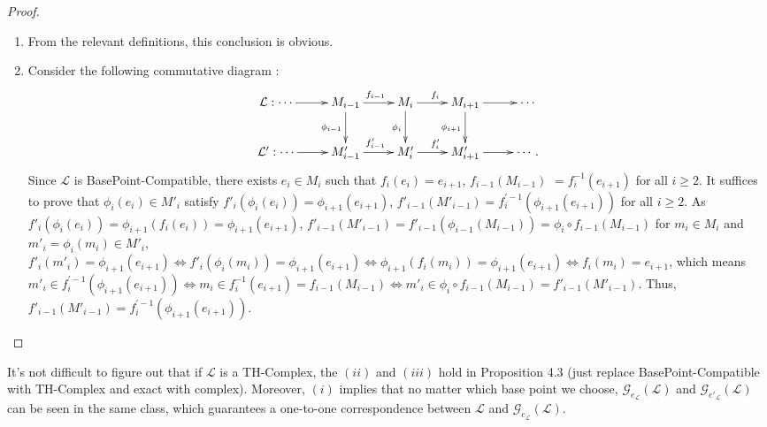 \documentclass[11pt, twoside]{article}
\begin{document}
\begin{proof}
\begin{enumerate}
  \begin{align*}
\tau^{e'_{i+1}}_{f_{i}(e'_{i})}f_i\tau^{e'_i}_{e_i}(m)&=\tau^{e'_{i+1}}_{f_{i}(e'_{i})}f_i([m,e_i,e'_i])\\
&=[[f_i(m),f_i(e_i),f_i(e'_i)],f_{i}(e'_{i}),e'_{i+1}]\\
&=[f_i(m),f_i(e_i),e'_{i+1}]
\end{align*}
and
  \begin{align*}
\tau^{e'_{i+1}}_{e_{i+1}}\tau^{e_{i+1}}_{f_{i}(e_{i})}f_i(m)&=\tau^{e'_{i+1}}_{e_{i+1}}([f_i(m),e_{i+1},f_{i}(e_{i})])\\
&=[[f_i(m),f_{i}(e_{i}),e_{i+1}],e_{i+1},e'_{i+1}]\\
&=[f_i(m),f_i(e_i),e'_{i+1}],
\end{align*}
$\tau^{e'_{i+1}}_{f_{i}(e'_{i})}f_i\tau^{e'_i}_{e_i}=\tau^{e'_{i+1}}_{e_{i+1}}\tau^{e_{i+1}}_{f_{i}(e_{i})}f_i,$ which means the diagram is commutative.
    \item[(ii)] From the relevant definitions, this conclusion is obvious.
    \item[(iii)] Consider the following commutative diagram :\\
    $$ \xymatrix{\mathcal{L}:\cdots \ar[r] & M_{i-1} \ar[d]_{\phi_{i-1}} \ar[r]^{f_{i-1}} & M_{i} \ar[d]_{\phi_i} \ar[r]^{f_{i}} & M_{i+1} \ar[d]_{\phi_{i+1}} \ar[r] & \cdots\\
  \mathcal{L'}:\cdots \ar[r] & M'_{i-1} \ar[r]^{f'_{i-1}} & M'_{i} \ar[r]^{f'_{i}} & M'_{i+1} \ar[r] & \cdots.} $$
Since $\mathcal{L}$ is BasePoint-Compatible, there exists $e_i \in M_i$ such that $f_i(e_i) = e_{i+1}$, $f_{i-1}(M_{i-1})$ $= f_{i}^{-1}(e_{i+1})$ for all $i \geq 2$. It suffices to prove that $\phi_i(e_i) \in M'_i$ satisfy $f'_i(\phi_i(e_i)) = \phi_{i+1}(e_{i+1})$, $f'_{i-1}(M'_{i-1}) = f_{i}^{'-1}(\phi_{i+1}(e_{i+1}))$ for all $i \geq 2$. As $f'_i(\phi_i(e_i)) = \phi_{i+1}(f_i(e_i)) = \phi_{i+1}(e_{i+1})$, $f'_{i-1}(M'_{i-1}) = f'_{i-1}(\phi_{i-1}(M_{i-1})) = \phi_i \circ f_{i-1}(M_{i-1})$ for $ m_{i} \in M_i$ and $m'_{i} =\phi_i(m_{i}) \in M'_i$, $f'_{i}(m'_{i}) = \phi_{i+1}(e_{i+1}) \Leftrightarrow f'_{i}(\phi_i(m_{i})) = \phi_{i+1}(e_{i+1}) \Leftrightarrow \phi_{i+1}(f_i(m_{i})) = \phi_{i+1}(e_{i+1}) \Leftrightarrow f_i(m_{i}) = e_{i+1}$, which means $m'_{i} \in f_{i}^{'-1}(\phi_{i+1}(e_{i+1})) \Leftrightarrow m_{i} \in f_{i}^{-1}(e_{i+1}) = f_{i-1}(M_{i-1}) \Leftrightarrow m'_{i} \in \phi_i \circ f_{i-1}(M_{i-1} ) = f'_{i-1}(M'_{i-1})$. Thus, $f'_{i-1}(M'_{i-1}) = f_{i}^{'-1}(\phi_{i+1}(e_{i+1}))$.
\end{enumerate}
\end{proof}
It's not difficult to figure out that if $\mathcal{L}$ is a TH-Complex, the $(ii)$ and $(iii)$ hold in Proposition 4.3 (just replace BasePoint-Compatible with TH-Complex and exact with complex). Moreover, $(i)$ implies that no matter which base point we choose, $\mathcal{G}_{e_\mathcal{L}}(\mathcal{L})$ and $\mathcal{G}_{e'_\mathcal{L}}(\mathcal{L})$ can be seen in the same class, which guarantees a one-to-one correspondence between $\mathcal{L}$ and $\mathcal{G}_{e_\mathcal{L}}(\mathcal{L})$.
\end{document}
